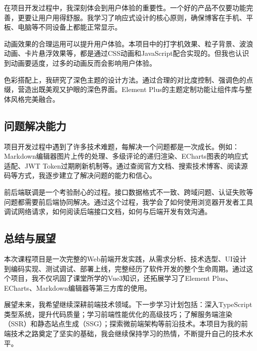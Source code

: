 \documentclass[12pt,a4paper]{article}
\begin{document}
在项目开发过程中，我深刻体会到用户体验的重要性。一个好的产品不仅要功能完善，更要让用户用得舒服。我学习了响应式设计的核心原则，确保博客在手机、平板、电脑等不同设备上都能正常显示。

动画效果的合理运用可以提升用户体验。本项目中的打字机效果、粒子背景、波浪动画、卡片悬浮效果等，都是通过CSS动画和JavaScript配合实现的。但我也认识到动画要适度，过多的动画反而会影响用户体验。

色彩搭配上，我研究了深色主题的设计方法。通过合理的对比度控制、强调色的点缀，营造出既美观又护眼的深色界面。Element Plus的主题定制功能让组件库与整体风格完美融合。

\subsection{问题解决能力}

项目开发过程中遇到了许多技术难题，每解决一个问题都是一次成长。例如：Markdown编辑器图片上传的处理、多级评论的递归渲染、ECharts图表的响应式适配、JWT Token过期刷新机制等。通过查阅官方文档、搜索技术博客、阅读源码等方式，我逐步建立了解决问题的能力和信心。

前后端联调是一个考验耐心的过程。接口数据格式不一致、跨域问题、认证失败等问题都需要前后端协同解决。通过这个过程，我学会了如何使用浏览器开发者工具调试网络请求，如何阅读后端接口文档，如何与后端开发有效沟通。

\subsection{总结与展望}

本次课程项目是一次完整的Web前端开发实践，从需求分析、技术选型、UI设计到编码实现、测试调试、部署上线，完整经历了软件开发的整个生命周期。通过这个项目，我不仅巩固了课堂所学的Vue3知识，还拓展学习了Element Plus、ECharts、Markdown编辑器等第三方库的使用。

展望未来，我希望继续深耕前端技术领域。下一步学习计划包括：深入TypeScript类型系统，提升代码质量；学习前端性能优化的高级技巧；了解服务端渲染（SSR）和静态站点生成（SSG）；探索微前端架构等前沿技术。本项目为我的前端技术之路奠定了坚实的基础，我会继续保持学习的热情，不断提升自己的技术水平。
\end{document}
